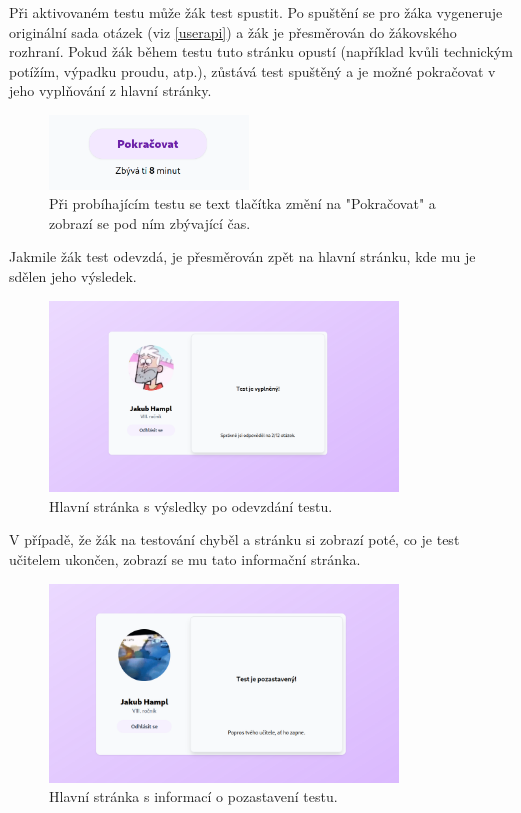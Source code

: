 Při aktivovaném testu může žák test spustit. Po spuštění se pro žáka vygeneruje originální sada otázek (viz \ref{userapi}) a žák je přesměrován do žákovského rozhraní. Pokud žák během testu tuto stránku opustí (například kvůli technickým potížím, výpadku proudu, atp.), zůstává test spuštěný a je možné pokračovat v jeho vyplňování z hlavní stránky. 

\begin{figure}[H]
    \centering
    \includegraphics[width=200px]{images/01design/continue.png}
    \caption{Při probíhajícím testu se text tlačítka změní na "Pokračovat" a zobrazí se pod ním zbývající čas.}
\end{figure}

Jakmile žák test odevzdá, je přesměrován zpět na hlavní stránku, kde mu je sdělen jeho výsledek.

\begin{figure}[H]
    \centering
    \includegraphics[width=350px]{images/01design/filled-out.png}
    \caption{Hlavní stránka s výsledky po odevzdání testu.}
\end{figure}

V případě, že žák na testování chyběl a stránku si zobrazí poté, co je test učitelem ukončen, zobrazí se mu tato informační stránka.

\begin{figure}[H]
    \centering
    \includegraphics[width=350px]{images/01design/pending.png}
    \caption{Hlavní stránka s informací o pozastavení testu.}
\end{figure}

